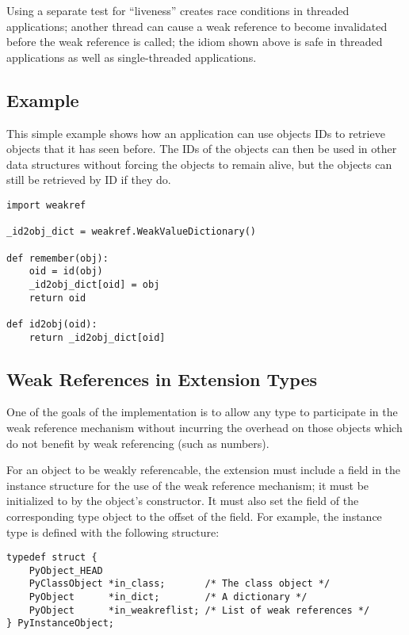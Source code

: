 Using a separate test for ``liveness'' creates race conditions in
threaded applications; another thread can cause a weak reference to
become invalidated before the weak reference is called; the
idiom shown above is safe in threaded applications as well as
single-threaded applications.


\subsection{Example \label{weakref-example}}

This simple example shows how an application can use objects IDs to
retrieve objects that it has seen before.  The IDs of the objects can
then be used in other data structures without forcing the objects to
remain alive, but the objects can still be retrieved by ID if they
do.

\begin{verbatim}
import weakref

_id2obj_dict = weakref.WeakValueDictionary()

def remember(obj):
    oid = id(obj)
    _id2obj_dict[oid] = obj
    return oid

def id2obj(oid):
    return _id2obj_dict[oid]
\end{verbatim}


\subsection{Weak References in Extension Types
            \label{weakref-extension}}

One of the goals of the implementation is to allow any type to
participate in the weak reference mechanism without incurring the
overhead on those objects which do not benefit by weak referencing
(such as numbers).

For an object to be weakly referencable, the extension must include a
 field in the instance structure for the use of the
weak reference mechanism; it must be initialized to \NULL{} by the
object's constructor.  It must also set the 
field of the corresponding type object to the offset of the field.
For example, the instance type is defined with the following structure:

\begin{verbatim}
typedef struct {
    PyObject_HEAD
    PyClassObject *in_class;       /* The class object */
    PyObject      *in_dict;        /* A dictionary */
    PyObject      *in_weakreflist; /* List of weak references */
} PyInstanceObject;
\end{verbatim}


